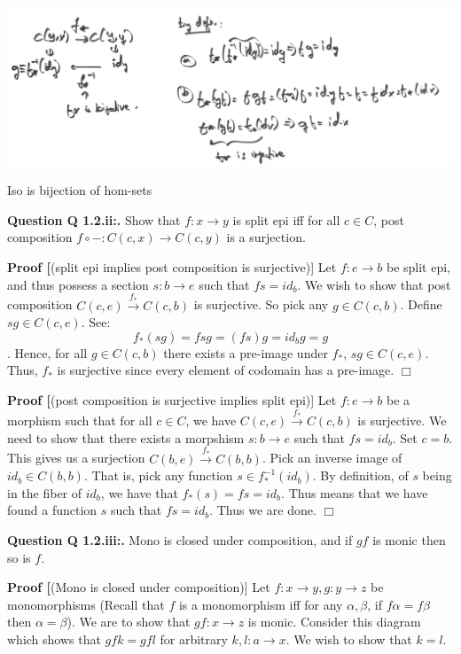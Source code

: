 \documentclass[11pt]{report}
\def\qed{$\Box$}
\newcommand*{\question}[1]{\leavevmode\newline \textbf{Question #1.}}
\newcommand*{\proof}[1]{\leavevmode\newline \textbf{Proof #1}}
\begin{document}
\begin{minipage}{\textwidth}
\includegraphics[width=\textwidth]{ch1/iso-is-bijection-of-hom.png}
    \begin{center}Iso is bijection of hom-sets\end{center}
\end{minipage}

\question{Q 1.2.ii:} Show that $f: x \rightarrow y$ is split epi iff for all $c \in C$, post composition
$f \circ - : C(c, x) \rightarrow C(c, y)$ is a surjection.


\proof[(split epi implies post composition is surjective)]
Let $f: e \rightarrow b$ be split epi, and thus possess a section $s: b \rightarrow e$ such that $fs = id_b$.
We wish to show that post composition $C(c, e) \xrightarrow{f_*} C(c, b)$ is surjective.
So pick any $g \in C(c, b)$. Define $sg \in C(c, e)$. See: $$f_*(sg) = fsg = (fs)g = id_b g = g$$.
Hence, for all $g \in C(c, b)$ there exists a pre-image under $f_*$, $sg \in C(c, e)$. Thus, $f_*$ is surjective
since every element of codomain has a pre-image. \qed


\proof[(post composition is surjective implies split epi)]
Let $f: e \to b$ be a morphism such that for all $c \in C$, we have $C(c, e) \xrightarrow{f_*} C(c, b)$ is surjective.
We need to show that there exists a morpshism $s: b \rightarrow e$ such that $fs = id_b$. Set $c = b$.
This gives us a surjection $C(b, e) \xrightarrow{f_*} C(b, b)$. Pick an inverse image of $id_b \in C(b, b)$. 
That is, pick any function $s \in f_*^{-1}(id_b)$. By definition, of $s$ being in the fiber of $id_b$,
we have that $f_*(s) = fs = id_b$. Thus means that we have found a function $s$ such that $fs = id_b$. Thus we are done.
\qed

\question{Q 1.2.iii:} Mono is closed under composition, and if $gf$ is monic then so is $f$.


\proof[(Mono is closed under composition)]
Let $f: x \to y, g: y \to z$ be monomorphisms (Recall that $f$ is a monomorphism iff for any $\alpha, \beta$, if $f \alpha = f \beta$ then $\alpha = \beta$).
We are to show that $gf: x \to z$ is monic.
Consider this diagram which shows that $gfk = gfl$ for arbitrary $k, l: a \to x$. We wish to show that $k=l$.
\end{document}
